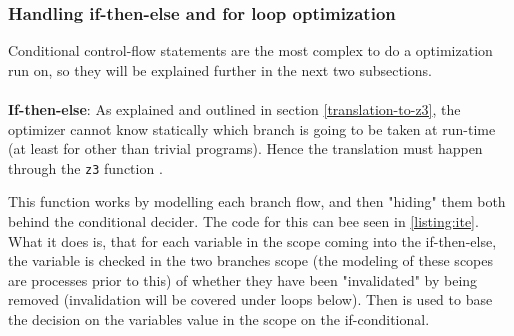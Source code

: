 \subsubsection{Handling if-then-else and for loop optimization } \label{sec:optLoopIte}
Conditional control-flow statements are the most complex to do a optimization run on, so they
will be explained further in the next two subsections.
\\
\\
\textbf{If-then-else}: As explained and outlined in section \ref{translation-to-z3}, the optimizer
cannot know statically which branch is going to be taken at run-time (at least for other than
trivial programs). Hence the translation must happen through the \texttt{z3} function
.

This function works by modelling each branch flow, and then "hiding" them both behind the
conditional decider. The code for this can bee seen in \autoref{listing:ite}. What it does
is, that for each variable in the scope coming into the if-then-else, the variable is checked
in the two branches scope (the modeling of these scopes are processes prior to this) of whether
they have been "invalidated" by being removed (invalidation will be covered under loops below).
Then  is used to base the decision on the variables value in the scope on the
if-conditional.

